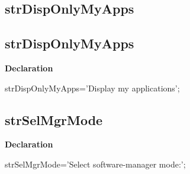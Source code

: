 \documentclass{report}
\newif\ifpdf
\begin{document}
\subsection*{\large{\textbf{strDispOnlyMyApps}}\normalsize\hspace{1ex}\hrulefill}
\else
\subsection*{strDispOnlyMyApps}
\fi
\label{trstrings-strDispOnlyMyApps}
\begin{list}{}{
\setlength{\itemindent}{0cm}
\setlength{\listparindent}{0cm}
\setlength{\leftmargin}{\evensidemargin}
\addtolength{\leftmargin}{\tmplength}
\settowidth{\labelsep}{X}
\addtolength{\leftmargin}{\labelsep}
\setlength{\labelwidth}{\tmplength}
}
\item[\textbf{Declaration}\hfill]
\ifpdf
\begin{flushleft}
\fi
\begin{ttfamily}
strDispOnlyMyApps='Display my applications';\end{ttfamily}

\ifpdf
\end{flushleft}
\fi

\end{list}
\ifpdf
\subsection*{\large{\textbf{strSelMgrMode}}\normalsize\hspace{1ex}\hrulefill}
\else
\subsection*{strSelMgrMode}
\fi
\label{trstrings-strSelMgrMode}
\begin{list}{}{
\setlength{\itemindent}{0cm}
\setlength{\listparindent}{0cm}
\setlength{\leftmargin}{\evensidemargin}
\addtolength{\leftmargin}{\tmplength}
\settowidth{\labelsep}{X}
\addtolength{\leftmargin}{\labelsep}
\setlength{\labelwidth}{\tmplength}
}
\item[\textbf{Declaration}\hfill]
\ifpdf
\begin{flushleft}
\fi
\begin{ttfamily}
strSelMgrMode='Select software-manager mode:';\end{ttfamily}

\ifpdf
\end{flushleft}
\fi

\end{list}
\ifpdf
\end{document}
